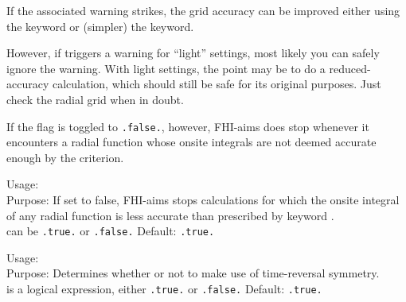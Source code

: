 If the associated warning strikes, the grid accuracy can be improved
either using the  keyword or (simpler) the
 keyword.

However, if 
triggers a warning for ``light'' settings, most likely you can safely
ignore the warning. With light settings, the point may be to do a
reduced-accuracy calculation, which should still be safe for its
original purposes. Just check the radial grid when in doubt.

If the flag  is toggled to
\texttt{.false.}, however, FHI-aims does stop whenever it encounters a
radial function whose onsite integrals are not deemed accurate enough
by the  criterion.

{
  \noindent
  Usage:   \\[1.0ex]
  Purpose: If set to false, FHI-aims stops calculations for which the
    onsite integral of any radial function is less accurate than
    prescribed by keyword . \\[1.0ex]
   can be \texttt{.true.} or \texttt{.false.} Default: \texttt{.true.} \\
}

{
  \noindent
  Usage:   \\[1.0ex]
  Purpose: Determines whether or not to make use of time-reversal symmetry.
  \\[1.0ex] 
   is a logical expression, either \texttt{.true.} or
    \texttt{.false.} Default: \texttt{.true.} \\
}


